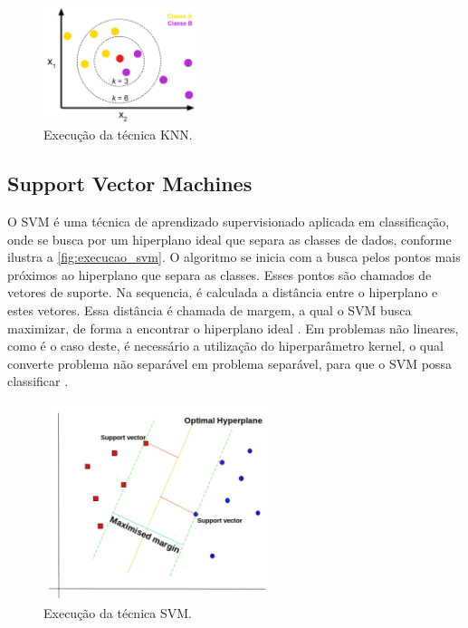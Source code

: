 \begin{figure}[h]
  \centering
  \caption{Execução da técnica KNN.}
   \label{fig:execucao_knn}
   \includegraphics[width=0.4\textwidth]{figuras/fig_6.png}
\end{figure}

\subsection{Support Vector Machines}

O SVM é uma técnica de aprendizado supervisionado aplicada em classificação, onde se busca por um hiperplano ideal que separa as classes de dados, conforme ilustra a \autoref{fig:execucao_svm}. O algoritmo se inicia com a busca pelos pontos mais próximos ao hiperplano que separa as classes. Esses pontos são chamados de vetores de suporte. Na sequencia, é calculada a distância entre o hiperplano e estes vetores. Essa distância é chamada de margem, a qual o SVM busca maximizar, de forma a encontrar o hiperplano ideal \cite{Pupale2019}. Em problemas não lineares, como é o caso deste, é necessário a utilização do hiperparâmetro kernel, o qual converte problema não separável em problema separável, para que o SVM possa classificar \cite{Shubham2018}.

\begin{figure}[h]
  \centering
  \caption{Execução da técnica SVM.}
   \label{fig:execucao_svm}
   \includegraphics[width=0.6\textwidth]{figuras/fig_7.png}
\end{figure}

